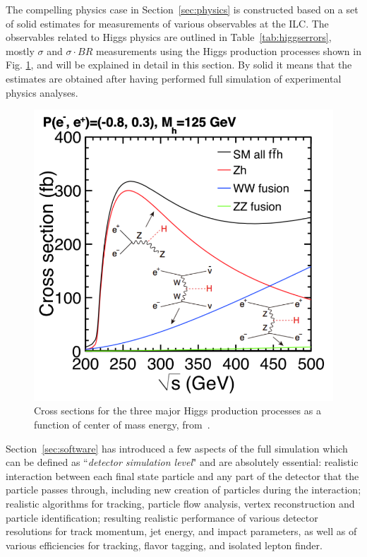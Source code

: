 The compelling physics case in Section~\ref{sec:physics} is constructed 
based on a set of solid estimates for measurements of various observables at the ILC. 
The observables related to Higgs physics are outlined in Table~\ref{tab:higgserrors}, 
mostly $\sigma$ and $\sigma\cdot BR$ measurements
using the Higgs production processes shown in Fig. \ref{fig:HiggsProdILC},
 and will be explained in detail in this section. 
By solid it means that the estimates are obtained after having performed
full simulation of experimental physics analyses. 

\begin{figure}
\begin{center}
\includegraphics[width=0.85\hsize]{chapters/figures/xsec_h_ILC_left.pdf}
\end{center}
\caption{Cross sections for the three major Higgs production processes
  as a function of 
center of mass energy, 
from~\cite{Baer:2013cma}.}
\label{fig:HiggsProdILC}
\end{figure}

Section~\ref{sec:software} has introduced a few aspects of the full simulation
which can be defined as ``{\it detector simulation level}" and are absolutely essential: 
realistic interaction between each final state particle and 
any part of the detector that the particle passes through, including new creation of
particles during the interaction; realistic algorithms for tracking,
particle flow analysis, vertex reconstruction and particle identification; 
resulting realistic performance of various detector resolutions for track momentum, jet energy,
and impact parameters, as well as of various efficiencies for tracking, flavor tagging, 
and isolated lepton finder. 

